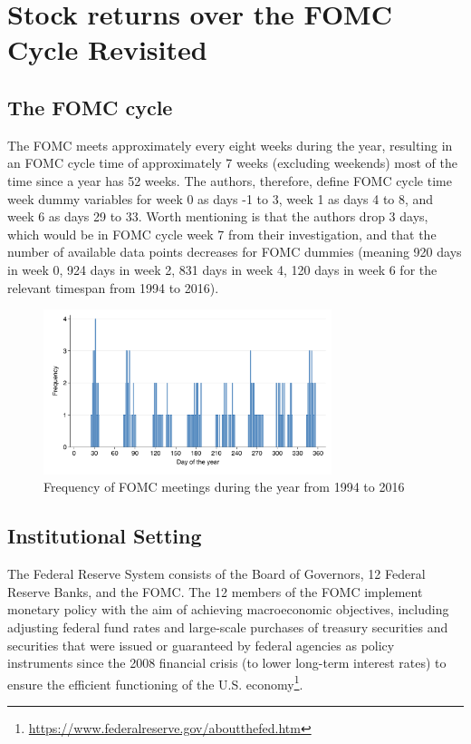 \chapter{Stock returns over the FOMC Cycle Revisited }


\section{The FOMC cycle}

The FOMC meets approximately every eight weeks during the year,  resulting in an FOMC cycle time of approximately 7 weeks (excluding weekends) most of the time since a year has 52 weeks. The authors, therefore, define FOMC cycle time week dummy variables for week 0 as days -1 to 3, week 1 as days 4 to 8, and week 6 as days 29 to 33. Worth mentioning is that the authors drop 3 days, which would be in FOMC cycle week 7 from their investigation, and that the number of available data points decreases for FOMC dummies (meaning 920 days in week 0,  924 days in week 2,  831 days in week 4,  120 days in week 6 for the relevant timespan from 1994 to 2016).

\label{cies19_fig2}
\begin{figure}[h]
    \centering
    \includegraphics[width=0.75\textwidth]{figures/cies19/fig2}
    \caption{Frequency of FOMC meetings during the year from 1994 to 2016 \parencite{cieslak_stock_2019}}
\end{figure}


\section{Institutional Setting}

 The Federal Reserve System consists of the Board of Governors, 12 Federal Reserve Banks, and the FOMC. The 12 members of the FOMC implement monetary policy with the aim of achieving macroeconomic objectives, including adjusting federal fund rates and large-scale purchases of treasury securities and securities that were issued or guaranteed by federal agencies as policy instruments since the 2008 financial crisis (to lower long-term interest rates) to ensure the efficient functioning of the U.S. economy\footnote{\url{https://www.federalreserve.gov/aboutthefed.htm}}.  

